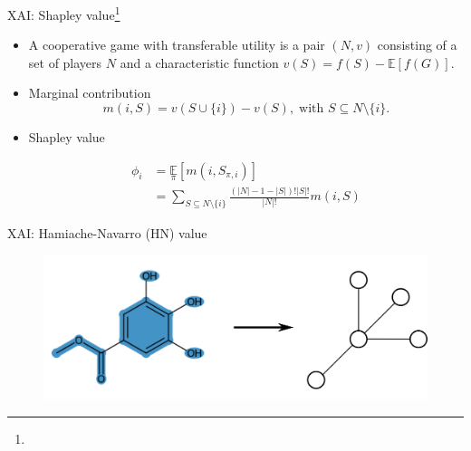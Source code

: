\documentclass[aspectratio=169]{beamer}
\begin{document}
\begin{frame}{XAI: Shapley value\footnote[frame]{}}


    \begin{itemize}[<+->]
        \item A cooperative game with transferable utility is
        a pair $(N, v)$ consisting of a set of players $N$ 
        and a characteristic function $v(S) = f(S) - \mathbb{E}[f(G)]$.

        \item Marginal contribution \begin{equation}
            m(i, S) = v\left(S \cup \{i\}\right) - v\left(S\right), \; \text{with } S \subseteq N \setminus \{i\}.
        \end{equation}

        \item Shapley value \begin{center}
            \begin{align}
                \phi_i &= \underset{\pi}{\mathbb{E}} \left[ m\left(i, S_{\pi, i} \right) \right] \\
                    &= \sum_{S \subseteq N \setminus \{i\}} \frac{\left(|N| - 1 - |S|\right)!|S|!}{|N|!} m(i, S)
            \end{align}
        \end{center}
    \end{itemize}
       
\end{frame}


\begin{frame}{XAI: Hamiache-Navarro (HN) value}

        \begin{figure}[h]
            \centering
            \includegraphics[scale=0.6]{./img/why_HN_value.png}
        \end{figure}

\end{frame}
\end{document}
